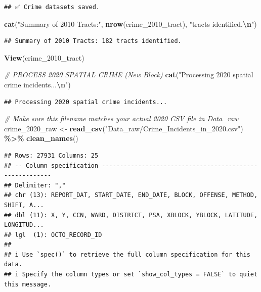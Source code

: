 \documentclass[
]{article}
\newenvironment{Shaded}{\begin{snugshade}}{\end{snugshade}}
\newcommand{\CommentTok}[1]{\textcolor[rgb]{0.56,0.35,0.01}{\textit{#1}}}
\newcommand{\FunctionTok}[1]{\textcolor[rgb]{0.13,0.29,0.53}{\textbf{#1}}}
\newcommand{\NormalTok}[1]{#1}
\newcommand{\OtherTok}[1]{\textcolor[rgb]{0.56,0.35,0.01}{#1}}
\newcommand{\SpecialCharTok}[1]{\textcolor[rgb]{0.81,0.36,0.00}{\textbf{#1}}}
\newcommand{\StringTok}[1]{\textcolor[rgb]{0.31,0.60,0.02}{#1}}
\begin{document}
\begin{verbatim}
## ✅ Crime datasets saved.
\end{verbatim}

\begin{Shaded}
\begin{Highlighting}[]
\FunctionTok{cat}\NormalTok{(}\StringTok{"Summary of 2010 Tracts:"}\NormalTok{, }\FunctionTok{nrow}\NormalTok{(crime\_2010\_tract), }\StringTok{"tracts identified.}\SpecialCharTok{\textbackslash{}n}\StringTok{"}\NormalTok{)}
\end{Highlighting}
\end{Shaded}

\begin{verbatim}
## Summary of 2010 Tracts: 182 tracts identified.
\end{verbatim}

\begin{Shaded}
\begin{Highlighting}[]
\FunctionTok{View}\NormalTok{(crime\_2010\_tract)}

\CommentTok{\# PROCESS 2020 SPATIAL CRIME (New Block)}
\FunctionTok{cat}\NormalTok{(}\StringTok{"Processing 2020 spatial crime incidents...}\SpecialCharTok{\textbackslash{}n}\StringTok{"}\NormalTok{)}
\end{Highlighting}
\end{Shaded}

\begin{verbatim}
## Processing 2020 spatial crime incidents...
\end{verbatim}

\begin{Shaded}
\begin{Highlighting}[]
\CommentTok{\# Make sure this filename matches your actual 2020 CSV file in Data\_raw}
\NormalTok{crime\_2020\_raw }\OtherTok{\textless{}{-}} \FunctionTok{read\_csv}\NormalTok{(}\StringTok{"Data\_raw/Crime\_Incidents\_in\_2020.csv"}\NormalTok{) }\SpecialCharTok{\%\textgreater{}\%} \FunctionTok{clean\_names}\NormalTok{()}
\end{Highlighting}
\end{Shaded}

\begin{verbatim}
## Rows: 27931 Columns: 25
## -- Column specification --------------------------------------------------------
## Delimiter: ","
## chr (13): REPORT_DAT, START_DATE, END_DATE, BLOCK, OFFENSE, METHOD, SHIFT, A...
## dbl (11): X, Y, CCN, WARD, DISTRICT, PSA, XBLOCK, YBLOCK, LATITUDE, LONGITUD...
## lgl  (1): OCTO_RECORD_ID
## 
## i Use `spec()` to retrieve the full column specification for this data.
## i Specify the column types or set `show_col_types = FALSE` to quiet this message.
\end{verbatim}
\end{document}
